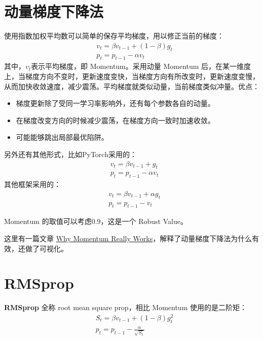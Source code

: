 \documentclass[../../main.tex]{subfiles}
\begin{document}
\section{动量梯度下降法}
使用指数加权平均数可以简单的保存平均梯度，用以修正当前的梯度：
\begin{align*}
     & v_t = βv_{t-1} + (1-β)g_{t} \\
     & p_t = p_{t-1} - αv_t
\end{align*}
其中，\(v_t\)表示平均梯度，即 Momentum。采用动量 Momentum 后，在某一维度上，当梯度方向不变时，更新速度变快，当梯度方向有所改变时，更新速度变慢，从而加快收敛速度，减少震荡。平均梯度就类似动量，当前梯度类似冲量。优点：
\begin{itemize}
    \item 梯度更新除了受同一学习率影响外，还有每个参数各自的动量。
    \item 在梯度改变方向的时候减少震荡，在梯度方向一致时加速收敛。
    \item 可能能够跳出局部最优陷阱。
\end{itemize}

另外还有其他形式，比如PyTorch采用的：
\begin{align*}
     & v_t = βv_{t-1} + g_{t} \\
     & p_t = p_{t-1} - αv_t
\end{align*}
其他框架采用的：
\begin{align*}
     & v_t = βv_{t-1} + αg_{t} \\
     & p_t = p_{t-1} - v_t
\end{align*}

\begin{remark}
    Momentum 的取值可以考虑0.9，这是一个 Robust Value。
\end{remark}

这里有一篇文章 \href{https://distill.pub/2017/momentum/}{Why Momentum Really Works}，解释了动量梯度下降法为什么有效，还做了可视化。

\section{RMSprop}
\textbf{RMSprop} 全称 root mean square prop，相比 Momentum 使用的是二阶矩：
\begin{align*}
     & S_t = βv_{t-1} + (1-β)g_{t}^2        \\
     & p_t = p_{t-1} - \frac{α}{\sqrt{S_t}}
\end{align*}
\end{document}
